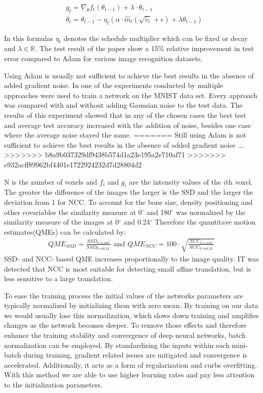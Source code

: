 \documentclass[
a4paper, 
12pt,
grayscalebody, %
abstract=on,
twoside, BCOR10mm, 12pt, DIV13,headinclude, footexclude, final, abstracton, openright
]{ibireprt}
\numberwithin{equation}{chapter}
\numberwithin{table}{chapter}
\numberwithin{figure}{chapter}
\numberwithin{algorithm}{chapter}
\numberwithin{example}{chapter}
\numberwithin{example}{chapter}
\begin{document}
\begin{align}
		&g_t  = \nabla_\theta f_t(\theta_{t-1})+\lambda\cdot\theta_{t-1}\\
		&\theta_t = \theta_{t-1}-\eta_t (\alpha\cdot\hat{m}_t(\sqrt{\hat{v}_t}+\epsilon)+\lambda\theta_{t-1})
\end{align}  

In this formulas $\eta_t$ denotes the schedule multiplier which can be fixed or decay and $\lambda \in \mathbb{R}$. The test result of the paper show a 15\% relative improvement in test error compared to Adam for various image recognition datasets.

 
Using Adam is usually not sufficient to achieve the best results in the absence of added gradient noise. In one of the experiments conducted by \cite{Neelakantan2015} multiple approaches were used to train a network on the MNIST data set. Every approach was compared with and without adding Gaussian noise to the test data. The results of this experiment showed that in any of the chosen cases the best test and average test accuracy increased with the addition of noise, besides one case where the average noise stayed the same. 
=======
Still using Adam is not sufficient to achieve the best results in the absence of added gradient noise \cite{Neelakantan2015}...%
>>>>>>> b8a9b037329df9438b574d1a23e195a2e710af71
>>>>>>> e932acff89962bf4401e1722924232d7d28804d2

N is the number of voxels and $f_i$ and $g_i$ are the intensity values of the $i$th voxel. The greater the difference of the images the larger is the SSD and the larger the deviation from 1 for NCC. To account for the bone size, density positioning and other covariables the similarity measure at 0$^{\circ}$ and 180$^{\circ}$ was normalized by the similarity measure of the images at 0$^{\circ}$ and 0.24$^{\circ}$
Therefore the quantitave motion estimates(QMEs) can be calculated by: 
\begin{align}
	QME_{SSD}= \frac{SSD_{0^{\circ} vs 180^{\circ}}}{SSD_{0^{\circ} vs 0.24^{\circ}}} \textrm{ and }	QME_{NCC}=100 \cdot \sqrt{ \frac{NCC_{0^{\circ} vs 180^{\circ}}}{NCC_{0^{\circ} vs 0.24^{\circ}}}}
\end{align}
SSD- and NCC- based QME increases proportionally to the image quality. IT was detected that NCC is most suitable for detecting small affine translation, but is less sensitive to a large translation.


To ease the training process the initial values of the networks parameters are typically normalized by initializing them with zero mean. By training on our data we would usually lose this normalization, which slows down training and amplifies changes as the network becomes deeper. To remove those effects and therefore enhance the training stability and convergence of deep neural networks, batch normalization can be employed. \cite{Ioffe2015} By standardizing the inputs within each mini-batch during training, gradient related issues are mitigated and convergence is  accelerated. Additionally, it acts as a form of regularization and curbs overfitting. With this method we are able to use higher learning rates and pay less attention to the initialization parameters. \cite{Ruder2016} 
\end{document}
